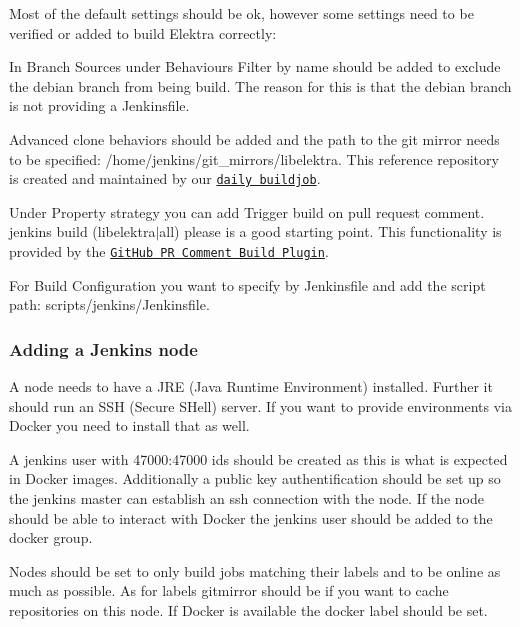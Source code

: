 Most of the default settings should be ok, however some settings need to be verified or added to build Elektra correctly\+:
\begin{DoxyItemize}
\item In Branch Sources under Behaviours {\ttfamily Filter by name} should be added to exclude the {\ttfamily debian} branch from being build. The reason for this is that the {\ttfamily debian} branch is not providing a Jenkinsfile.
\item {\ttfamily Advanced clone behaviors} should be added and the path to the git mirror needs to be specified\+: {\ttfamily /home/jenkins/git\+\_\+mirrors/libelektra}. This reference repository is created and maintained by our \href{https://build.libelektra.org/jenkins/job/libelektra-daily/}{\tt daily buildjob}.
\item Under Property strategy you can add {\ttfamily Trigger build on pull request comment}. {\ttfamily jenkins build (libelektra$\vert$all) please} is a good starting point. This functionality is provided by the \href{https://wiki.jenkins-ci.org/display/JENKINS/GitHub+PR+Comment+Build+Plugin}{\tt Git\+Hub PR Comment Build Plugin}.
\item For Build Configuration you want to specify {\ttfamily by Jenkinsfile} and add the script path\+: {\ttfamily scripts/jenkins/\+Jenkinsfile}.
\end{DoxyItemize}

\subsubsection*{Adding a Jenkins node}

A node needs to have a J\+RE (Java Runtime Environment) installed. Further it should run an S\+SH (Secure S\+Hell) server. If you want to provide environments via Docker you need to install that as well.

A {\ttfamily jenkins} user with 47000\+:47000 ids should be created as this is what is expected in Docker images. Additionally a public key authentification should be set up so the jenkins master can establish an ssh connection with the node. If the node should be able to interact with Docker the jenkins user should be added to the {\ttfamily docker} group.

Nodes should be set to only build jobs matching their labels and to be online as much as possible. As for labels {\ttfamily gitmirror} should be if you want to cache repositories on this node. If Docker is available the {\ttfamily docker} label should be set.

